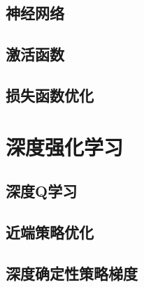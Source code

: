 \subsection{神经网络}

\subsection{激活函数}

\subsection{损失函数优化}

\section{深度强化学习}

\subsection{深度Q学习}

\subsection{近端策略优化}

\subsection{深度确定性策略梯度}
